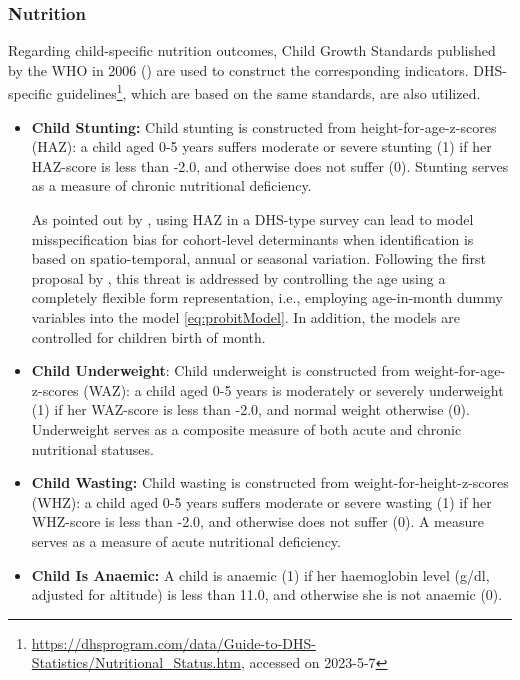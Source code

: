 \documentclass[12pt,a4paper,notitlepage]{article}
\begin{document}
\subsubsection{Nutrition} \label{subsubsec:nutrition}

Regarding child-specific nutrition outcomes, Child Growth Standards published by the WHO in 2006 (\citet{world2006child}) are used to construct the corresponding indicators. DHS-specific guidelines\footnote{\href{https://dhsprogram.com/data/Guide-to-DHS-Statistics/Nutritional_Status.htm}{https://dhsprogram.com/data/Guide-to-DHS-Statistics/Nutritional\_Status.htm}, accessed on 2023-5-7}, which are based on the same standards, are also utilized.

\begin{itemize}
    \item \textbf{Child Stunting:} Child stunting is constructed from height\hyp{}for\hyp{}age\hyp{}z\hyp{}scores (HAZ): a child aged 0-5 years suffers moderate or severe stunting (1) if her HAZ-score is less than -2.0, and otherwise does not suffer (0). Stunting serves as a measure of chronic nutritional deficiency.

    As pointed out by \citet{Cummins2013}, using HAZ in a DHS-type survey can lead to model misspecification bias for cohort-level determinants when identification is based on spatio-temporal, annual or seasonal variation. Following the first proposal by \citet{Cummins2013}, this threat is addressed by controlling the age using a completely flexible form representation, i.e., employing age-in-month dummy variables into the model \cref{eq:probitModel}. In addition, the models are controlled for children birth of month.

    \item \textbf{Child Underweight}: Child underweight is constructed from weight\hyp{}for\hyp{}age\hyp{}z\hyp{}scores (WAZ): a child aged 0-5 years is moderately or severely underweight (1) if her WAZ-score is less than -2.0, and normal weight otherwise (0). Underweight serves as a composite measure of both acute and chronic nutritional statuses.

    \item \textbf{Child Wasting:} Child wasting is constructed from weight\hyp{}for\hyp{}height\hyp{}z\hyp{}scores (WHZ): a child aged 0-5 years suffers moderate or severe wasting (1) if her WHZ-score is less than -2.0, and otherwise does not suffer (0). A measure serves as a measure of acute nutritional deficiency.

    \item \textbf{Child Is Anaemic:} A child is anaemic (1) if her haemoglobin level (g/dl, adjusted for altitude) is less than 11.0, and otherwise she is  not anaemic (0).


\end{itemize}
\end{document}
